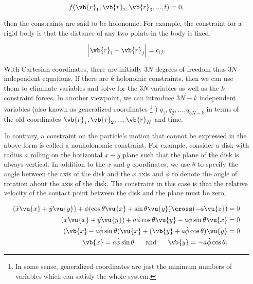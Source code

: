 \documentclass[a4paper,12pt]{report}
\begin{document}
\begin{equation}
	f(\vb{r} _{1} , \vb{r} _{2} , \vb{r} _{3} , ..., t) = 0,
\end{equation}

then the constraints are said to be holonomic. For example, the constraint for a rigid body is that the distance of any two points in the body is fixed, \ie 

\begin{equation}
	\left| \vb{r} _{i} - \vb{r} _{j}  \right| = c_{ij} .
\end{equation}

With Cartesian coordinates, there are initially \(3N\) degrees of freedom thus \(3N\) independent equations. If there are \(k\) holonomic constraints, then we can use them to eliminate variables and solve for the \(3N\) variables as well as the \(k\) constraint forces. In another viewpoint, we can introduce \(3N - k\) independent variables (also known as generalized coordinates \footnote{In some sense, generalized coordinates are just the minimum numbers of variables which can satisfy the whole system.} ) \(q_{1} , q_{2}, ...,q_{3N - k} \) in terms of the old coordinates \(\vb{r} _{1} , \vb{r} _{2} , ..., \vb{r} _{N} \) and time.  

In contrary, a constraint on the particle's motion that cannot be expressed in the above form is called a nonholonomic constraint. For example, consider a disk with radius \(a\) rolling on the horizontal \(x-y\) plane such that the plane of the disk is always vertical. In addition to the \(x \text{ and }  y\) coordinates, we use \(\theta \) to specify the angle between the axis of the disk and the \(x\) axis and \(\phi \) to denote the angle of rotation about the axis of the disk. The constraint in this case is that the relative velocity of the contact point between the disk and the plane must be zero, \ie 

\begin{equation}
\begin{aligned}
	(\dot{x} \vu{x} + \dot{y} \vu{y} ) + \dot{\phi } (\cos \theta \vu{x} + \sin \theta \vu{y} ) \cross (-a\vu{z} ) &= 0 \\
	(\dot{x} \vu{x} + \dot{y} \vu{y} ) + a\dot{\phi } \cos \theta \vu{y} - a\dot{\phi } \sin \theta \vu{x} &= 0 \\
	(\vb{x} - a\dot{\phi } \sin \theta) \vu{x} + (\vb{y} + a\dot{\phi } \cos \theta)\vu{y} &= 0 \\
	\vb{x} = a\dot{\phi } \sin \theta ~~~~\text{ and }~~~~ \vb{y} = -a\dot{\phi } \cos \theta.
\end{aligned}
\end{equation}
\end{document}
